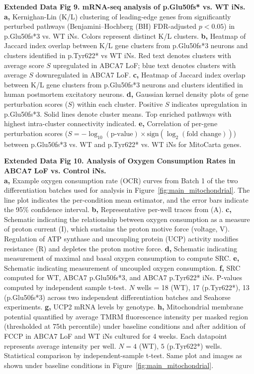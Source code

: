 \textbf{Extended Data Fig 9. mRNA-seq analysis of p.Glu50fs* vs. WT iNs.}\\
\textbf{a,} Kernighan-Lin (K/L) clustering of leading-edge genes from significantly perturbed pathways (Benjamini–Hochberg (BH) FDR-adjusted $p<0.05$) in p.Glu50fs*3 vs. WT iNs. Colors represent distinct K/L clusters.
\textbf{b,} Heatmap of Jaccard index overlap between K/L gene clusters from p.Glu50fs*3 neurons and clusters identified in p.Tyr622* vs WT iNs. Red text denotes clusters with average score $S$ upregulated in ABCA7 LoF; blue text denotes clusters with average $S$ downregulated in ABCA7 LoF.
\textbf{c,} Heatmap of Jaccard index overlap between K/L gene clusters from p.Glu50fs*3 neurons and clusters identified in human postmortem excitatory neurons.
\textbf{d,} Gaussian kernel density plots of gene perturbation scores ($S$) within each cluster. Positive $S$ indicates upregulation in p.Glu50fs*3. Solid lines denote cluster means. Top enriched pathways with highest intra-cluster connectivity indicated.
\textbf{e,} Correlation of per-gene perturbation scores ($S = -\log_{10}(\text{p-value}) \times \text{sign}(\log_2(\text{fold change}))$) between p.Glu50fs*3 vs. WT and p.Tyr622* vs. WT iNs for MitoCarta genes.

\textbf{Extended Data Fig 10. Analysis of Oxygen Consumption Rates in ABCA7 LoF vs. Control iNs.}\\
\textbf{a,} Example oxygen consumption rate (OCR) curves from Batch 1 of the two differentiation batches used for analysis in Figure~\ref{fig:main_mitochondrial}. The line plot indicates the per-condition mean estimator, and the error bars indicate the 95\% confidence interval. 
\textbf{b,} Representative per-well traces from (A). 
\textbf{c,} Schematic indicating the relationship between oxygen consumption as a measure of proton current (I), which sustains the proton motive force (voltage, V). Regulation of ATP synthase and uncoupling protein (UCP) activity modifies resistance (R) and depletes the proton motive force.
\textbf{d,} Schematic indicating measurement of maximal and basal oxygen consumption to compute SRC.
\textbf{e,} Schematic indicating measurement of uncoupled oxygen consumption.
\textbf{f,} SRC computed for WT, ABCA7 p.Glu50fs*3, and ABCA7 p.Tyr622* iNs. P-values computed by independent sample t-test. $N$ wells = 18 (WT), 17 (p.Tyr622*), 13 (p.Glu50fs*3) across two independent differentiation batches and Seahorse experiments. 
\textbf{g,} UCP2 mRNA levels by genotype. 
\textbf{h,} Mitochondrial membrane potential quantified by average TMRM fluorescence intensity per masked region (thresholded at 75th percentile) under baseline conditions and after addition of FCCP in ABCA7 LoF and WT iNs cultured for 4 weeks. Each datapoint represents average intensity per well. $N=4$ (WT), $5$ (p.Tyr622*) wells. Statistical comparison by independent-sample t-test. Same plot and images as shown under baseline conditions in Figure~\ref{fig:main_mitochondrial}.

